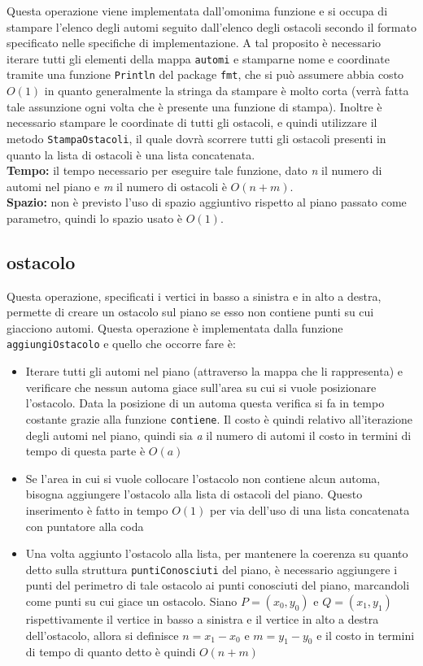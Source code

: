 \documentclass[a4paper,11pt]{article}
\begin{document}
Questa operazione viene implementata dall'omonima funzione e si occupa di stampare l'elenco degli automi seguito dall'elenco degli ostacoli secondo il formato specificato nelle specifiche di implementazione. A tal proposito è necessario iterare tutti gli elementi della mappa \texttt{automi} e stamparne nome e coordinate tramite una funzione \texttt{Println} del package \texttt{fmt}, che si può assumere abbia costo $O(1)$ in quanto generalmente la stringa da stampare è molto corta (verrà fatta tale assunzione ogni volta che è presente una funzione di stampa). Inoltre è necessario stampare le coordinate di tutti gli ostacoli, e quindi utilizzare il metodo \texttt{StampaOstacoli}, il quale dovrà scorrere tutti gli ostacoli presenti in quanto la lista di ostacoli è una lista concatenata. \\
\textbf{Tempo:} il tempo necessario per eseguire tale funzione, dato \textit{n} il numero di automi nel piano e \textit{m} il numero di ostacoli è $O(n + m)$.\\
\textbf{Spazio:} non è previsto l'uso di spazio aggiuntivo rispetto al piano passato come parametro, quindi lo spazio usato è $O(1)$. 


\subsection{ostacolo}

Questa operazione, specificati i vertici in basso a sinistra e in alto a destra, permette di creare un ostacolo sul piano se esso non contiene punti su cui giacciono automi. Questa operazione è implementata dalla funzione \texttt{aggiungiOstacolo} e quello che occorre fare è:

\begin{itemize}
    \item Iterare tutti gli automi nel piano (attraverso la mappa che li rappresenta) e verificare che nessun automa giace sull'area su cui si vuole posizionare l'ostacolo. Data la posizione di un automa questa verifica si fa in tempo costante grazie alla funzione \texttt{contiene}. Il costo è quindi relativo all'iterazione degli automi nel piano, quindi sia \textit{a} il numero di automi il costo in termini di tempo di questa parte è $O(a)$

    \item Se l'area in cui si vuole collocare l'ostacolo non contiene alcun automa, bisogna aggiungere l'ostacolo alla lista di ostacoli del piano. Questo inserimento è fatto in tempo $O(1)$ per via dell'uso di una lista concatenata con puntatore alla coda


    \item Una volta aggiunto l'ostacolo alla lista, per mantenere la coerenza su quanto detto sulla struttura \texttt{puntiConosciuti} del piano, è necessario aggiungere i punti del perimetro di tale ostacolo ai punti conosciuti del piano, marcandoli come punti su cui giace un ostacolo. Siano $P = (x_0, y_0)$ e $Q = (x_1, y_1)$ rispettivamente il vertice in basso a sinistra e il vertice in alto a destra dell'ostacolo, allora si definisce $n = x_1 - x_0$ e $m = y_1 - y_0$ e il costo in termini di tempo di quanto detto è quindi $O(n + m)$
\end{itemize}
\end{document}
